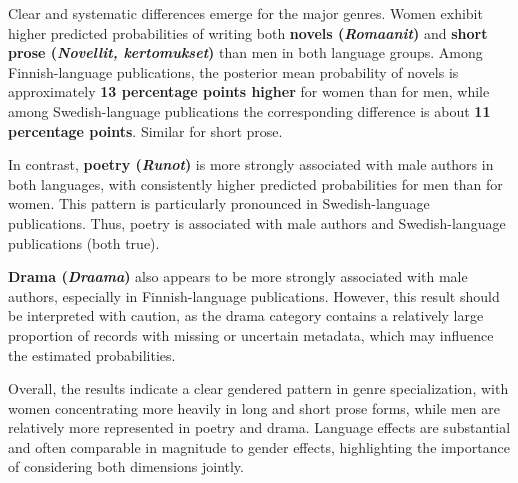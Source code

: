 \documentclass[
  letterpaper,
  DIV=11,
  numbers=noendperiod]{scrartcl}
\begin{document}
Clear and systematic differences emerge for the major genres. Women
exhibit higher predicted probabilities of writing both \textbf{novels
(\emph{Romaanit})} and \textbf{short prose (\emph{Novellit,
kertomukset})} than men in both language groups. Among Finnish-language
publications, the posterior mean probability of novels is approximately
\textbf{13 percentage points higher} for women than for men, while among
Swedish-language publications the corresponding difference is about
\textbf{11 percentage points}. Similar for short prose.

In contrast, \textbf{poetry (\emph{Runot})} is more strongly associated
with male authors in both languages, with consistently higher predicted
probabilities for men than for women. This pattern is particularly
pronounced in Swedish-language publications. Thus, poetry is associated
with male authors and Swedish-language publications (both true).

\textbf{Drama (\emph{Draama})} also appears to be more strongly
associated with male authors, especially in Finnish-language
publications. However, this result should be interpreted with caution,
as the drama category contains a relatively large proportion of records
with missing or uncertain metadata, which may influence the estimated
probabilities.

Overall, the results indicate a clear gendered pattern in genre
specialization, with women concentrating more heavily in long and short
prose forms, while men are relatively more represented in poetry and
drama. Language effects are substantial and often comparable in
magnitude to gender effects, highlighting the importance of considering
both dimensions jointly.
\end{document}
